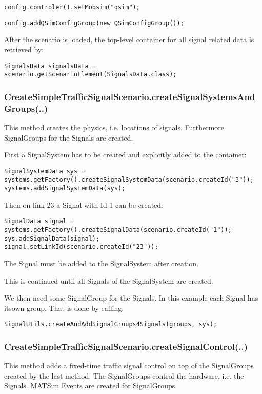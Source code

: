 \texttt{\nolinebreak config.controler().setMobsim("qsim"); \nolinebreak }


\texttt{\nolinebreak config.addQSimConfigGroup(new QSimConfigGroup());}

After the scenario is loaded, the top-level container for all signal related data is retrieved by:


\texttt{\nolinebreak SignalsData signalsData = scenario.getScenarioElement(SignalsData.class);}

\subsubsection{CreateSimpleTrafficSignalScenario.createSignalSystemsAndGroups(..)}

This method creates the physics, i.e. locations of signals. Furthermore SignalGroups for the Signals are created.

First a SignalSystem has to be created and explicitly added to the container:


\texttt{\nolinebreak SignalSystemData sys = systems.getFactory().createSignalSystemData(scenario.createId("3"));
\\  \nolinebreak systems.addSignalSystemData(sys);}

Then on link 23 a Signal with Id 1 can be created:


\texttt{\nolinebreak SignalData signal = systems.getFactory().createSignalData(scenario.createId("1"));
\\\nolinebreak sys.addSignalData(signal);
\\\nolinebreak signal.setLinkId(scenario.createId("23"));}

The Signal must be added to the SignalSystem after creation.

This is continued until all Signals of the SignalSystem are created.

We then need some SignalGroup for the Signals. In this example each Signal has its\nolinebreak own group. That is done by calling:


\texttt{\nolinebreak SignalUtils.createAndAddSignalGroups4Signals(groups, sys);}

\subsubsection{CreateSimpleTrafficSignalScenario.createSignalControl(..)}

This method adds a fixed-time traffic signal control on top of the SignalGroups created by the last method. The SignalGroups control the hardware, i.e. the Signals. MATSim Events are created for SignalGroups.

